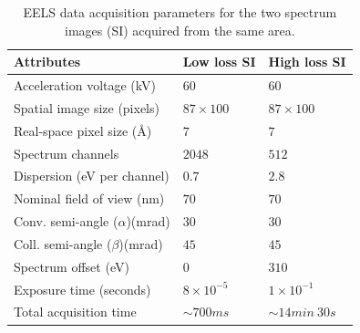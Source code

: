 \documentclass[%
aip,
rsi,%
 amsmath,amssymb,%
 reprint,%
]{revtex4-1}
\begin{document}
\begin{table}%
	\caption{EELS data acquisition parameters for the two spectrum images (SI) acquired from the same area.}
    \label{tab:Attributes}
	\begin{ruledtabular}
		\begin{tabular}{lll}
			Attributes&Low loss SI&High loss SI							\\ \hline
            Acceleration voltage (kV) &$60$&$60$						\\
			Spatial image size (pixels)&$87\times100$&$87\times100$ 	\\
            Real-space pixel size (\AA)&$7$&$7$							\\
            Spectrum channels		&$2048$&$512$						\\
			Dispersion (eV per channel)&$0.7$&$2.8$						\\
			Nominal field of view (nm) &$70$&$70$						\\
			Conv. semi-angle ($\alpha$)(mrad)&$30$&$30$					\\
			Coll. semi-angle ($\beta$)(mrad)&$45$&$45$					\\
			Spectrum offset (eV)&$0$&$310$								\\
			Exposure time (seconds)&$8\times10^{-5}$&$1\times10^{-1}$	\\
			Total acquisition time &$\sim700ms$&$\sim14min~30s$
		\end{tabular}
	\end{ruledtabular}
\end{table}
\end{document}
